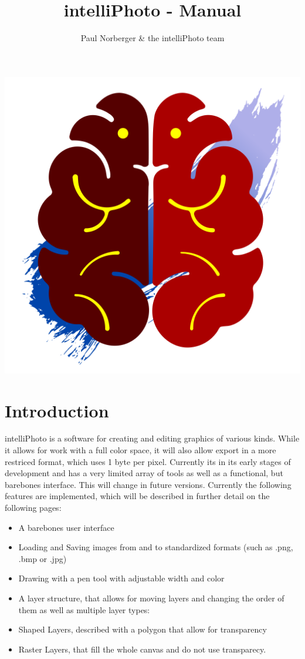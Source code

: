 \documentclass[a4paper, 12pt]{article}
\title{intelliPhoto - Manual}
\author{Paul Norberger \& the intelliPhoto team}
\begin{document}
\begin{titlepage}
\maketitle
\thispagestyle{empty}
\begin{center}
\includegraphics[width=0.45\linewidth,keepaspectratio]{assets/icon}
\end{center}
\tableofcontents
\end{titlepage}
\section{Introduction}
intelliPhoto is a software for creating and editing graphics of various kinds. While it allows for work with a full color space, it will also allow export in a more restriced format, which uses 1 byte per pixel. Currently its in its early stages of development and has a very limited array of tools as well as a functional, but barebones interface. This will change in future versions.
Currently the following features are implemented, which will be described in further detail on the following pages:
\begin{itemize}
\item A barebones user interface
\item Loading and Saving images from and to standardized formats (such as .png, .bmp or .jpg)
\item Drawing with a pen tool with adjustable width and color
\item A layer structure, that allows for moving layers and changing the order of them as well as multiple layer types:
\item Shaped Layers, described with a polygon that allow for transparency
\item Raster Layers, that fill the whole canvas and do not use transparecy.
\end{itemize}
\end{document}
